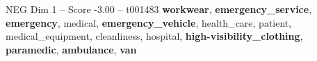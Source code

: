 \begin{textsample}{NEG Dim 1 – Score -3.00 – t001483}  \label{ex:f1_neg_035}
\textbf{workwear}, \textbf{emergency\_service}, \textbf{emergency}, medical, \textbf{emergency\_vehicle}, health\_care, patient, medical\_equipment, cleanliness, hospital, \textbf{high-visibility\_clothing}, \textbf{paramedic}, \textbf{ambulance}, \textbf{van}

\end{textsample}

